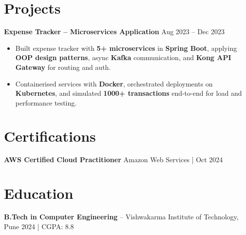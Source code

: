 \documentclass[a4paper,10pt]{article}
\begin{document}
\section*{Projects}

\textbf{Expense Tracker -- Microservices Application} \hfill Aug 2023 -- Dec 2023
\begin{itemize}[leftmargin=*]
    \item Built expense tracker with \textbf{5+ microservices} in \textbf{Spring Boot}, applying \textbf{OOP design patterns}, async \textbf{Kafka} communication, and \textbf{Kong API Gateway} for routing and auth.
    \item Containerised services with \textbf{Docker}, orchestrated deployments on \textbf{Kubernetes}, and simulated \textbf{1000+ transactions} end-to-end for load and performance testing.
\end{itemize}

\section*{Certifications}
\textbf{AWS Certified Cloud Practitioner} \hfill Amazon Web Services \;|\; Oct 2024

\section*{Education}
\textbf{B.Tech in Computer Engineering} -- Vishwakarma Institute of Technology, Pune \hfill 2024 \;|\; CGPA: 8.8
\end{document}
